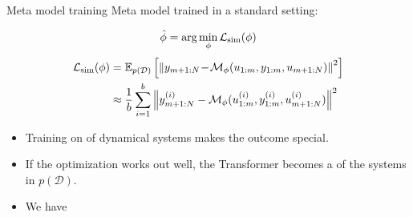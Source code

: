 \documentclass{beamer}
\newcommand{\free}{\mathcal{M}}
\newcommand{\D}{\mathcal{D}}
\newcommand{\nsamp}{N}
\newcommand{\norm}[1]{\left\lVert#1\right\rVert}
\newcommand{\E}{\mathbb{E}}
\begin{document}
\begin{frame}{Meta model training}
Meta model trained in a standard  setting: 
\begin{small}
     $$\hat \phi = \arg \min_\phi \mathcal{L}_{\rm sim}(\phi)$$
\begin{align*}
     \mathcal{L}_{\rm sim}(\phi)   &=   \E_{p(\D)}
     \left [
     \norm{y_{m+1:\nsamp} \! - \! \free_\phi (u_{1:m}, y_{1:m}, u_{m+1:\nsamp})
     }^2
     \right ] \\
      & \approx
     \frac{1}{b}
     \sum_{i=1}^b
     \norm{y_{m+1:\nsamp}^{(i)} - \free_\phi (u_{1:m}^{(i)}, y_{1:m}^{(i)}, u_{m+1:\nsamp}^{(i)})}^2
\end{align*}
\end{small}

\pause
\begin{itemize}
\item Training on  of dynamical systems
makes the outcome special.
\item If the optimization works out well, the Transformer becomes a  of the systems in $p(\D)$.
\item We have 
\end{itemize}
\end{frame}
\end{document}
